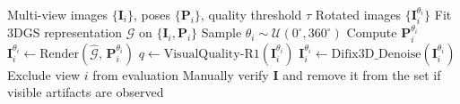 \renewcommand{\algorithmicrequire}{\textbf{Input:}}
\renewcommand{\algorithmicensure}{\textbf{Output:}}

\begin{algorithm}[!htb]
\caption{Rendering-Based Rotated Image Generation}
\label{alg:rotation_generation}
\begin{algorithmic}[1]
    \REQUIRE Multi-view images $\{\mathbf{I}_i\}$, poses $\{\mathbf{P}_i\}$, quality threshold $\tau$
    \ENSURE Rotated images $\{\mathbf{I}_i^{\theta_i}\}$
    \STATE Fit 3DGS representation $\mathcal{G}$ on $\{\mathbf{I}_i, \mathbf{P}_i\}$
        \STATE Sample $\theta_i \sim \mathcal{U}(0^\circ, 360^\circ)$
        \STATE Compute $\mathbf{P}_i^{\theta_i}$
        \STATE $\mathbf{I}_i^{\theta_i} \leftarrow \mathrm{Render}(\hat{\mathcal{G}},\, \mathbf{P}_i^{\theta_i})$
        \STATE $q \leftarrow \mathrm{VisualQuality\text{-}R1}(\mathbf{I}_i^{\theta_i})$
            \STATE $\mathbf{I}_i^{\theta_i} \leftarrow \mathrm{Difix3D\_Denoise}(\mathbf{I}_i^{\theta_i})$  
                \STATE Exclude view $i$ from evaluation
            \ENDIF
        \ENDIF
    \ENDFOR
        \STATE Manually verify $\mathbf{I}$ and remove it from the set if visible artifacts are observed
    \ENDFOR
\end{algorithmic}
\end{algorithm}

